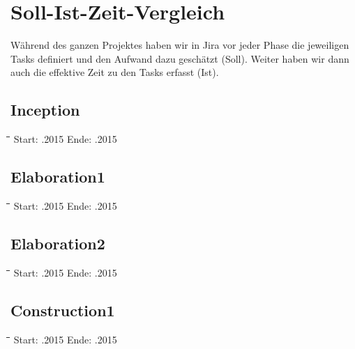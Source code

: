 \section{Soll-Ist-Zeit-Vergleich}
Während des ganzen Projektes haben wir in Jira vor jeder Phase die jeweiligen Tasks definiert und den Aufwand dazu geschätzt (Soll). Weiter haben wir dann auch die effektive Zeit zu den Tasks erfasst (Ist).
\subsection{Inception}
\begin{tabbing}[H]
    \hspace*{3cm}\=\hspace*{5cm}\=\hspace*{3cm}\=\hspace*{3cm}\= \kill
    Start: .2015 \>	Ende: .2015 \\
\end{tabbing}
\newpage
\subsection{Elaboration1}
\begin{tabbing}[H]
    \hspace*{3cm}\=\hspace*{5cm}\=\hspace*{3cm}\=\hspace*{3cm}\= \kill
    Start: .2015 \> Ende: .2015 \\
\end{tabbing}

\subsection{Elaboration2}
\begin{tabbing}[H]
    \hspace*{3cm}\=\hspace*{5cm}\=\hspace*{3cm}\=\hspace*{3cm}\= \kill
    Start: .2015 \> Ende: .2015 \\
\end{tabbing}

\subsection{Construction1}
\begin{tabbing}[H]
    \hspace*{3cm}\=\hspace*{5cm}\=\hspace*{3cm}\=\hspace*{3cm}\= \kill
    Start: .2015 \>	Ende: .2015 \\
\end{tabbing}

